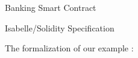 \documentclass[aspectratio=169]{beamer}
\begin{document}
\begin{frame}{Banking Smart Contract}
\begin{figure}[!h]
\begin{tikzpicture}
\end{tikzpicture}
\end{figure}
\end{frame}
\begin{frame}{Isabelle/Solidity Specification}

\begin{Example}{}{}
	The formalization of our example :
	\begin{center}
	\end{center}
\end{Example}
\end{frame}
\end{document}
